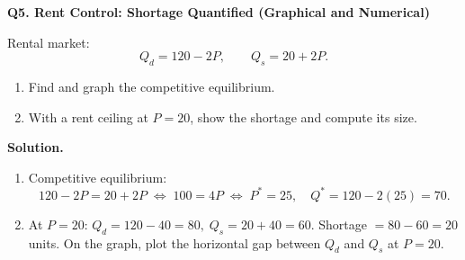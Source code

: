 \documentclass[11pt]{article}
\newcommand{\eq}{\Leftrightarrow}
\begin{document}

\bigskip

\noindent \textbf{Q5. Rent Control: Shortage Quantified (Graphical and Numerical)}

Rental market:
\[
Q_d=120-2P,\qquad Q_s=20+2P.
\]
\begin{enumerate}[label=(\alph*)]
\item Find and graph the competitive equilibrium.
\item With a rent ceiling at \(P=20\), show the shortage and compute its size.
\end{enumerate}

\textbf{Solution.}
\begin{enumerate}[label=(\alph*)]
\item Competitive equilibrium:
\[
120-2P=20+2P \;\eq\; 100=4P \;\eq\; P^\ast=25,\quad Q^\ast=120-2(25)=70.
\]
\item At \(P=20\): \(Q_d=120-40=80,\; Q_s=20+40=60\).
Shortage \(=80-60=20\) units. On the graph, plot the horizontal gap between \(Q_d\) and \(Q_s\) at \(P=20\).
\end{enumerate}

\end{document}
